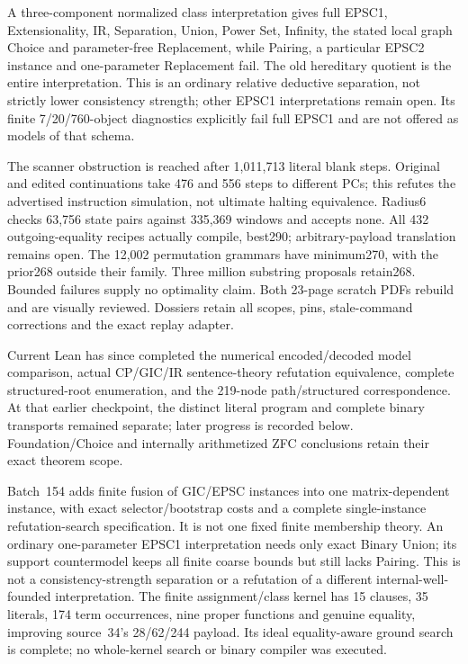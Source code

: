 \documentclass[11pt]{article}
\begin{document}
{A three-component normalized class interpretation gives full EPSC1,
Extensionality, IR, Separation, Union, Power Set, Infinity, the stated local
graph Choice and parameter-free Replacement, while Pairing, a particular
EPSC2 instance and one-parameter Replacement fail. The old hereditary
quotient is the entire interpretation. This is an ordinary relative
deductive separation, not strictly lower consistency strength; other EPSC1
interpretations remain open. Its finite 7/20/760-object diagnostics explicitly
fail full EPSC1 and are not offered as models of that schema.

The scanner obstruction is reached after 1,011,713 literal blank steps.
Original and edited continuations take 476 and 556 steps to different PCs;
this refutes the advertised instruction simulation, not ultimate halting
equivalence. Radius6 checks 63,756 state pairs against 335,369 windows and
accepts none. All 432 outgoing-equality recipes actually compile, best290;
arbitrary-payload translation remains open. The 12,002 permutation grammars
have minimum270, with the prior268 outside their family. Three million
substring proposals retain268. Bounded failures supply no optimality claim.
Both 23-page scratch PDFs rebuild and are visually reviewed. Dossiers retain
all scopes, pins, stale-command corrections and the exact replay adapter.

Current Lean has since completed the numerical encoded/decoded model
comparison, actual CP/GIC/IR sentence-theory refutation equivalence, complete
structured-root enumeration, and the 219-node path/structured correspondence.
At that earlier checkpoint, the distinct literal program and complete binary
transports remained separate; later progress is recorded below. Foundation/Choice
and internally arithmetized ZFC conclusions retain their exact theorem scope.

Batch~154 adds finite fusion of GIC/EPSC instances into one matrix-dependent
instance, with exact selector/bootstrap costs and a complete single-instance
refutation-search specification. It is not one fixed finite membership theory.
An ordinary one-parameter EPSC1 interpretation needs only exact Binary Union;
its support countermodel keeps all finite coarse bounds but still lacks Pairing.
This is not a consistency-strength separation or a refutation of a different
internal-well-founded interpretation. The finite assignment/class kernel has
15 clauses, 35 literals, 174 term occurrences, nine proper functions and genuine
equality, improving source~34's 28/62/244 payload. Its ideal equality-aware ground
search is complete; no whole-kernel search or binary compiler was executed.

}
\end{document}
